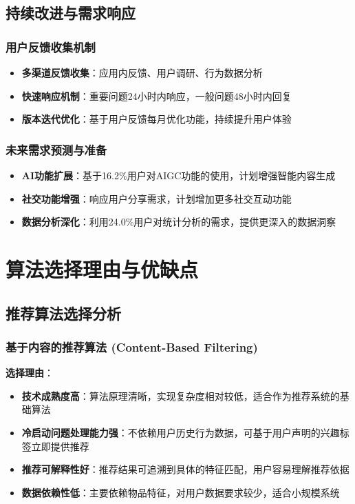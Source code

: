 \documentclass[12pt,a4paper]{article}
\begin{document}
\subsection{持续改进与需求响应}
\subsubsection{用户反馈收集机制}
\begin{itemize}
    \item \textbf{多渠道反馈收集}：应用内反馈、用户调研、行为数据分析
    \item \textbf{快速响应机制}：重要问题24小时内响应，一般问题48小时内回复
    \item \textbf{版本迭代优化}：基于用户反馈每月优化功能，持续提升用户体验
\end{itemize}

\subsubsection{未来需求预测与准备}
\begin{itemize}
    \item \textbf{AI功能扩展}：基于16.2\%用户对AIGC功能的使用，计划增强智能内容生成
    \item \textbf{社交功能增强}：响应用户分享需求，计划增加更多社交互动功能
    \item \textbf{数据分析深化}：利用24.0\%用户对统计分析的需求，提供更深入的数据洞察
\end{itemize}

\section{算法选择理由与优缺点}

\subsection{推荐算法选择分析}
\subsubsection{基于内容的推荐算法 (Content-Based Filtering)}
\textbf{选择理由}：
\begin{itemize}
    \item \textbf{技术成熟度高}：算法原理清晰，实现复杂度相对较低，适合作为推荐系统的基础算法
    \item \textbf{冷启动问题处理能力强}：不依赖用户历史行为数据，可基于用户声明的兴趣标签立即提供推荐
    \item \textbf{推荐可解释性好}：推荐结果可追溯到具体的特征匹配，用户容易理解推荐依据
    \item \textbf{数据依赖性低}：主要依赖物品特征，对用户数据要求较少，适合小规模系统
\end{itemize}
\end{document}
